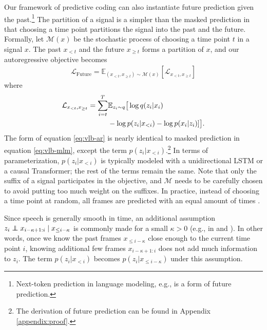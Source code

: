 Our framework of predictive coding can also instantiate future prediction given the past.\footnote{Next-token prediction in language modeling, e.g., is a form of future prediction.}
The partition of a signal is a simpler than the masked prediction in that choosing a time point partitions the signal into the past and the future.
Formally, let $\mathcal{M}(x)$ be the stochastic process of choosing a time point $t$ in a signal $x$.
The past $x_{< t}$ and the future $x_{\geq t}$ forms a partition of $x$, and our autoregressive objective becomes
\begin{align}
\mathcal{L}_{\text{Future}} = \mathbb{E}_{(x_{< t}, x_{\geq t}) \sim \mathcal{M}(x)} [\mathcal{L}_{x_{< t}, x_{\geq t}}]
\end{align}
where
\begin{align}
\mathcal{L}_{x_{< t}, x_{\geq t}}
  = \sum_{i = t}^{T} & \mathbb{E}_{z_i \sim q} \big[ \log q(z_i|x_i) \label{eq:vlb-ar} \\
  & - \log p(z_i|x_{< i}) - \log p(x_i | z_i)]\big]. \notag
\end{align}
The form of equation \ref{eq:vlb-ar} is nearly identical to masked prediction in equation \ref{eq:vlb-mlm}, except the term $p(z_i | x_{< i})$.\footnote{The derivation of future prediction can be found in Appendix \ref{appendix:proof}.}
In terms of parameterization, $p(z_i | x_{< i})$ is typically modeled with a unidirectional LSTM or a causal Transformer; the rest of the terms remain the same.
Note that only the suffix of a signal participates in the objective, and $\mathcal{M}$ needs to be carefully chosen to avoid putting too much weight on the suffixes.
In practice, instead of choosing a time point at random, all frames are predicted with an equal amount of times \citep{oord2018representation,chung2019unsupervised}.

Since speech is generally smooth in time, an additional assumption $z_i \perp\!\!\!\!\perp x_{i-\kappa+1:i} \mid x_{\leq i-\kappa}$ is commonly made for a small $\kappa > 0$ (e.g., in \citet{oord2018representation} and \citet{chung2019unsupervised}).
In other words, once we know the past frames $x_{\leq i-\kappa}$
close enough to the current time point $i$,
knowing additional few frames $x_{i-\kappa+1:i}$
does not add much information to $z_i$. 
The term $p(z_i | x_{< i})$ becomes $p(z_i | x_{\leq i-\kappa})$ under this assumption.

%
%
%
%
%
%
%
%
%
%
%
%
%
%
%
%
%
%
%
%
%
%
%
%
%
%
%
%
%
%
%
%
%
%
%
%
%
%
%
%
%
%
%
%
%
%
%
%
%
%
%

